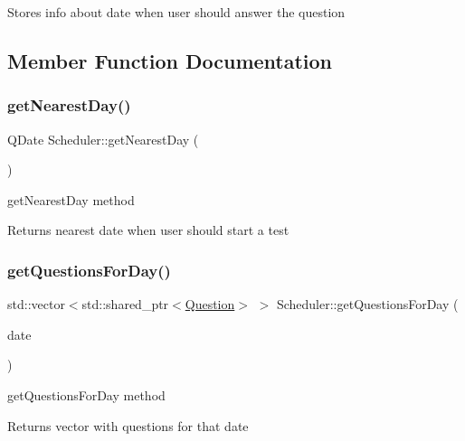 Stores info about date when user should answer the question 

\subsection{Member Function Documentation}
\mbox{\label{class_scheduler_ab959a8b807537fe7035261dfcad2e985}} 
\subsubsection{\texorpdfstring{get\+Nearest\+Day()}{getNearestDay()}}
{\footnotesize\ttfamily Q\+Date Scheduler\+::get\+Nearest\+Day (\begin{DoxyParamCaption}{ }\end{DoxyParamCaption})\hspace{0.3cm}{\ttfamily [inline]}}



get\+Nearest\+Day method 

\begin{DoxyReturn}{Returns}
nearest date when user should start a test 
\end{DoxyReturn}
\mbox{\label{class_scheduler_a4b18e745206d38e55dc115fbfa5af01f}} 
\subsubsection{\texorpdfstring{get\+Questions\+For\+Day()}{getQuestionsForDay()}}
{\footnotesize\ttfamily std\+::vector$<$std\+::shared\+\_\+ptr$<$\hyperlink{class_question}{Question}$>$ $>$ Scheduler\+::get\+Questions\+For\+Day (\begin{DoxyParamCaption}\item[{Q\+Date}]{date }\end{DoxyParamCaption})\hspace{0.3cm}{\ttfamily [inline]}}



get\+Questions\+For\+Day method 

\begin{DoxyReturn}{Returns}
vector with questions for that date 
\end{DoxyReturn}

